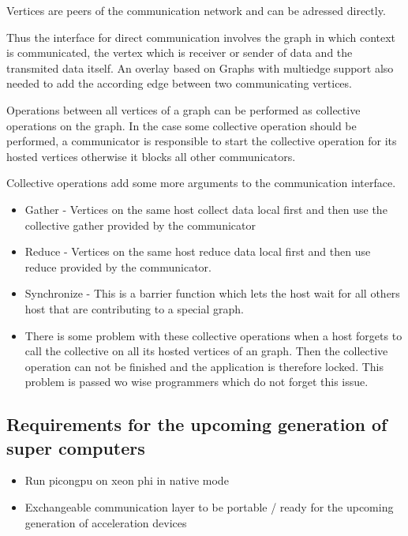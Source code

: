 Vertices are peers of the communication network and can be adressed
directly.

Thus the interface for direct communication involves the graph in
which context is communicated, the vertex which is receiver or sender
of data and the transmited data itself. An overlay based on Graphs
with multiedge support also needed to add the according edge between
two communicating vertices.

Operations between all vertices of a graph can be performed as
collective operations on the graph.  In the case some collective
operation should be performed, a communicator is responsible to start
the collective operation for its hosted vertices otherwise it blocks
all other communicators.

Collective operations add some more arguments to the communication
interface.

\begin{itemize}
\item Gather - Vertices on the same host collect data local first and
  then use the collective gather provided by the communicator
\item Reduce - Vertices on the same host reduce data local first and
  then use reduce provided by the communicator.
\item Synchronize - This is a barrier function which lets the host
  wait for all others host that are contributing to a special graph.
\item There is some problem with these collective operations when a
  host forgets to call the collective on all its hosted vertices of an
  graph.  Then the collective operation can not be finished and the
  application is therefore locked. This problem is passed wo wise
  programmers which do not forget this issue.
\end{itemize}




\subsection{Requirements for the upcoming generation of super computers}
\begin{itemize}
\item Run picongpu on xeon phi in native mode
\item Exchangeable communication layer to be portable / ready for the
  upcoming generation of acceleration devices
\end{itemize}


